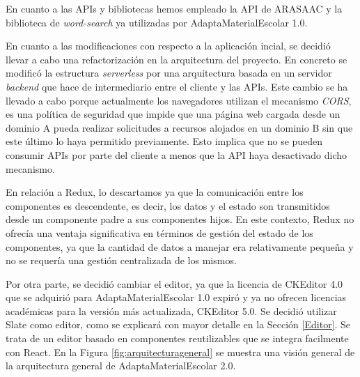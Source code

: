 En cuanto a las APIs y bibliotecas hemos empleado la API de ARASAAC y la biblioteca de \textit{word-search} ya utilizadas por AdaptaMaterialEscolar 1.0.

En cuanto a las modificaciones con respecto a la aplicación incial, se decidió llevar a cabo una refactorización en la arquitectura del proyecto. En concreto se modificó la estructura \textit{serverless} por una arquitectura basada en un servidor \textit{backend} que hace de intermediario entre el cliente y las APIs. Este cambio se ha llevado a cabo porque actualmente los navegadores utilizan el mecanismo \textit{CORS}, es una política de  seguridad que impide que una página web cargada desde un dominio A pueda realizar solicitudes a recursos alojados en un dominio B sin que este último lo haya permitido previamente. Esto implica que no se pueden consumir APIs por parte del cliente a menos que la API haya desactivado dicho mecanismo.

En relación a Redux, lo descartamos ya que la comunicación entre los componentes es descendente, es decir, los datos y el estado son transmitidos desde un componente padre a sus componentes hijos. En este contexto, Redux no ofrecía una ventaja significativa en términos de gestión del estado de los componentes, ya que la cantidad de datos a manejar era relativamente pequeña y no se requería una gestión centralizada de los mismos.

Por otra parte, se decidió cambiar el editor, ya que la licencia de CKEditor 4.0 que se adquirió para AdaptaMaterialEscolar 1.0 expiró y ya no ofrecen licencias académicas para la versión más actualizada, CKEditor 5.0. Se decidió utilizar Slate como editor, como se explicará con mayor detalle en la Sección \ref{Editor}. Se trata de un editor basado en componentes reutilizables que se integra facilmente con React. En la Figura \ref{fig:arquitecturageneral} se muestra una visión general de la arquitectura general de AdaptaMaterialEscolar 2.0.

